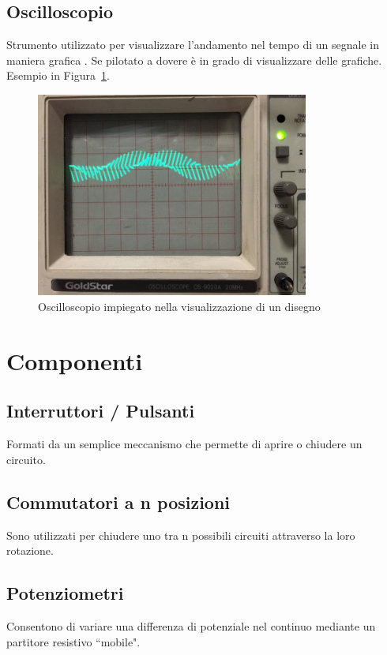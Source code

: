 \documentclass[12pt,a4paper]{report}
\begin{document}
\subsection{Oscilloscopio}
Strumento utilizzato per visualizzare l'andamento nel tempo di un segnale in maniera grafica \cite{itwiki:120862120}. Se pilotato a dovere è in grado di
visualizzare delle grafiche. Esempio in Figura~\ref{fig:oscilloscopio}.

\begin{figure}[h]
  \centering
  \includegraphics[width=0.8\textwidth]{oscilloscopio}
  \caption{Oscilloscopio impiegato nella visualizzazione di un disegno \cite{instructablesoscilloscope}}
  \label{fig:oscilloscopio}
\end{figure}

\section{Componenti}
\subsection{Interruttori / Pulsanti}
Formati da un semplice meccanismo che permette di aprire o chiudere un circuito.
\subsection{Commutatori a n posizioni}
Sono utilizzati per chiudere uno tra n possibili circuiti attraverso la loro rotazione.
\subsection{Potenziometri}
Consentono di variare una differenza di potenziale nel continuo mediante un partitore resistivo ``mobile".
\end{document}
